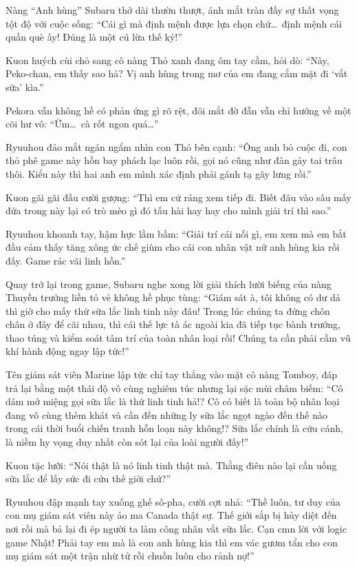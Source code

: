 \documentclass[../main.tex]{subfiles}
\begin{document}
\il

Nàng ``Anh hùng'' Subaru thở dài thườn thượt, ánh mắt tràn đầy sự thất vọng tột độ với cuộc sống: ``Cái gì mà định mệnh được lựa chọn chứ\dots\ định mệnh cái quần què ấy! Đúng là một cú lừa thế kỷ!''

\il

Kuon huých cùi chỏ sang cô nàng Thỏ xanh đang ôm tay cầm, hỏi dò: ``Này, Peko-chan, em thấy sao hả? Vị anh hùng trong mơ của em đang cắm mặt đi `vắt sữa' kìa.''

Pekora vẫn không hề có phản ứng gì rõ rệt, đôi mắt đờ đẫn vẫn chỉ hướng về một cõi hư vô: ``Ừm\dots\ cà rốt ngon quá\dots''

Ryuuhou đảo mắt ngán ngẩm nhìn con Thỏ bên cạnh: ``Ông anh bỏ cuộc đi, con thỏ phê game này hồn bay phách lạc luôn rồi, gọi nó cũng như đàn gảy tai trâu thôi. Kiểu này thì hai anh em mình xác định phải gánh tạ gãy lưng rồi.''

Kuon gãi gãi đầu cười gượng: ``Thì em cứ ráng xem tiếp đi. Biết đâu vào sâu mấy đứa trong này lại có trò mèo gì đó tấu hài hay hay cho mình giải trí thì sao.''

Ryuuhou khoanh tay, hậm hực lầm bầm: ``Giải trí cái nỗi gì, em xem mà em bắt đầu cảm thấy tăng xông ức chế giùm cho cái con nhân vật nữ anh hùng kia rồi đấy. Game rác vãi linh hồn.''

\il

Quay trở lại trong game, Subaru nghe xong lời giải thích lười biếng của nàng Thuyền trưởng liền tỏ vẻ không hề phục tùng: ``Giám sát à, tôi không có dư dả thì giờ cho mấy thứ sữa lắc linh tinh này đâu! Trong lúc chúng ta đứng chôn chân ở đây để cãi nhau, thì cái thế lực tà ác ngoài kia đã tiếp tục bành trướng, thao túng và kiểm soát tâm trí của toàn nhân loại rồi! Chúng ta cần phải cầm vũ khí hành động ngay lập tức!''

Tên giám sát viên Marine lập tức chỉ tay thẳng vào mặt cô nàng Tomboy, đáp trả lại bằng một thái độ vô cùng nghiêm túc nhưng lại sặc mùi châm biếm: ``Cô dám mở miệng gọi sữa lắc là thứ linh tinh hả!? Cô có biết là toàn bộ nhân loại đang vô cùng thèm khát và cần đến những ly sữa lắc ngọt ngào đến thế nào trong cái thời buổi chiến tranh hỗn loạn này không!? Sữa lắc chính là cứu cánh, là niềm hy vọng duy nhất còn sót lại của loài người đấy!''

\il

Kuon tặc lưỡi: ``Nói thật là nó linh tinh thật mà. Thằng điên nào lại cần uống sữa lắc để lấy sức đi cứu thế giới chứ?''

Ryuuhou đập mạnh tay xuống ghế sô-pha, cười cợt nhả: ``Thề luôn, tư duy của con mụ giám sát viên này ảo ma Canada thật sự. Thế giới sắp bị hủy diệt đến nơi rồi mà bả lại đi ép người ta làm công nhân vắt sữa lắc. Cạn cmn lời với logic game Nhật! Phải tay em mà là con anh hùng kia thì em vác gươm tẩn cho con mụ giám sát một trận nhừ tử rồi chuồn luôn cho rảnh nợ!''
\end{document}
